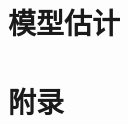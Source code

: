 \documentclass[10pt,a4paper,UTF8]{ctexbook} %
\begin{document}
\part{模型估计}

\part{附录}
\begin{appendices}
\appendixpage
\noappendicestocpagenum
\addappheadtotoc



\end{appendices}
\newpage{}

%

\listoffigures
\listoftables
\listoftodos
\printindex
\end{document}
